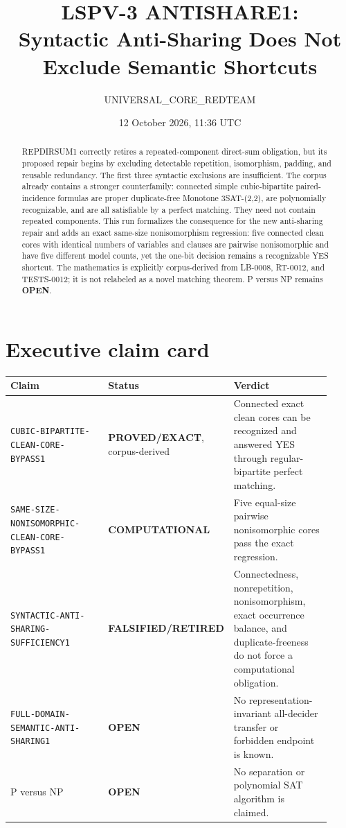 \documentclass[11pt]{article}
\title{LSPV-3 ANTISHARE1:\\
Syntactic Anti-Sharing Does Not Exclude Semantic Shortcuts}
\author{UNIVERSAL\_CORE\_REDTEAM}
\date{12 October 2026, 11:36 UTC}
\newcommand{\EXACT}{\textbf{PROVED/EXACT}}
\newcommand{\COMP}{\textbf{COMPUTATIONAL}}
\newcommand{\OPEN}{\textbf{OPEN}}
\newcommand{\RETIRED}{\textbf{FALSIFIED/RETIRED}}
\begin{document}
\sloppy
\maketitle

\begin{abstract}
REPDIRSUM1 correctly retires a repeated-component direct-sum obligation, but
its proposed repair begins by excluding detectable repetition, isomorphism,
padding, and reusable redundancy.  The first three syntactic exclusions are
insufficient.  The corpus already contains a stronger counterfamily: connected
simple cubic-bipartite paired-incidence formulas are proper duplicate-free
Monotone 3SAT-(2,2), are polynomially recognizable, and are all satisfiable by
a perfect matching.  They need not contain repeated components.  This run
formalizes the consequence for the new anti-sharing repair and adds an exact
same-size nonisomorphism regression: five connected clean cores with identical
numbers of variables and clauses are pairwise nonisomorphic and have five
different model counts, yet the one-bit decision remains a recognizable YES
shortcut.  The mathematics is explicitly corpus-derived from LB-0008,
RT-0012, and TESTS-0012; it is not relabeled as a novel matching theorem.
P versus NP remains \OPEN.
\end{abstract}

\section{Executive claim card}

\begin{center}\small
\begin{tabular}{p{0.37\linewidth}p{0.19\linewidth}p{0.36\linewidth}}
\toprule
Claim & Status & Verdict\\
\midrule
\texttt{CUBIC-BIPARTITE-CLEAN-CORE-BYPASS1} & \EXACT, corpus-derived &
Connected exact clean cores can be recognized and answered YES through
regular-bipartite perfect matching.\\
\texttt{SAME-SIZE-NONISOMORPHIC-CLEAN-CORE-BYPASS1} & \COMP &
Five equal-size pairwise nonisomorphic cores pass the exact regression.\\
\texttt{SYNTACTIC-ANTI-SHARING-SUFFICIENCY1} & \RETIRED &
Connectedness, nonrepetition, nonisomorphism, exact occurrence balance, and
duplicate-freeness do not force a computational obligation.\\
\texttt{FULL-DOMAIN-SEMANTIC-ANTI-SHARING1} & \OPEN &
No representation-invariant all-decider transfer or forbidden endpoint is
known.\\
P versus NP & \OPEN & No separation or polynomial SAT algorithm is claimed.\\
\bottomrule
\end{tabular}
\end{center}
\end{document}

